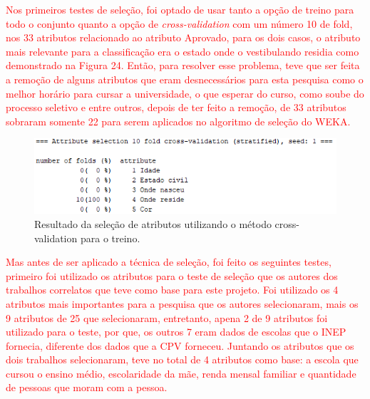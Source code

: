 \par
\textcolor{red}{Nos primeiros testes de seleção, foi optado de usar tanto a opção de treino para todo o conjunto quanto a opção de \textit{cross-validation} com um número 10 de fold, nos 33 atributos relacionado ao atributo Aprovado, para os dois casos, o atributo mais relevante para a classificação era o estado onde o vestibulando residia como demonstrado na Figura 24. Então, para resolver esse problema, teve que ser feita a remoção de alguns atributos que eram desnecessários para esta pesquisa como o melhor horário para cursar a universidade, o que esperar do curso, como soube do processo seletivo e entre outros, depois de ter feito a remoção, de 33 atributos sobraram somente 22 para serem aplicados no algoritmo de seleção do WEKA.}

\par
\begin{figure}[!htp]
	\begin{center}
    \caption{\label{fig:waveform_fig} Resultado da seleção de atributos utilizando o método cross-validation para o treino.}
	\includegraphics[scale=0.99]{Figuras/33_atributos.png}
	\end{center}
\end{figure}



\par
\textcolor{red}{Mas antes de ser aplicado a técnica de seleção, foi feito os seguintes testes, primeiro foi utilizado os atributos para o teste de seleção que os autores dos trabalhos correlatos que teve como base para este projeto. Foi utilizado os 4 atributos mais importantes para a pesquisa que os autores  selecionaram, mais os 9 atributos de 25 que  selecionaram, entretanto, apena 2 de 9 atributos foi utilizado para o teste, por que, os outros 7 eram dados de escolas que o INEP fornecia, diferente dos dados que a CPV forneceu. Juntando os atributos que os dois trabalhos selecionaram, teve no total de 4 atributos como base: a escola que cursou o ensino médio, escolaridade da mãe, renda mensal familiar e quantidade de pessoas que moram com a pessoa.}

